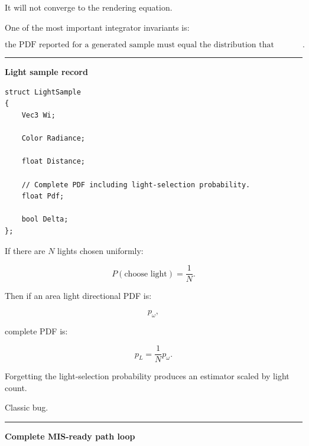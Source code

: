 It will not converge to the rendering equation.

One of the most important integrator invariants is:

\[
\boxed{
\text{the PDF reported for a generated sample must equal the distribution that actually generated it}.
}
\]

\begin{center}\rule{0.5\linewidth}{0.5pt}\end{center}

\textbf{Light sample record}

\begin{verbatim}
struct LightSample
{
    Vec3 Wi;

    Color Radiance;

    float Distance;

    // Complete PDF including light-selection probability.
    float Pdf;

    bool Delta;
};
\end{verbatim}

If there are \(N\) lights chosen uniformly:

\[
P(\text{choose light})
=
\frac1N.
\]

Then if an area light directional PDF is:

\[
p_\omega,
\]

complete PDF is:

\[
\boxed{
p_L=
\frac1N p_\omega.
}
\]

Forgetting the light-selection probability produces an estimator scaled by light count.

Classic bug.

\begin{center}\rule{0.5\linewidth}{0.5pt}\end{center}

\textbf{Complete MIS-ready path loop}

